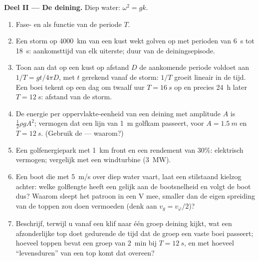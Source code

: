 \begin{problem}
\medskip
\noindent\textbf{Deel II --- De deining.}
Diep water: $\omega^2 = gk$.
\begin{enumerate}[resume]
  \item Fase- en  als functie van de periode $T$.
  \item Een storm op \qty{4000}{km} van een kust wekt golven op met perioden
        van \qty{6}{s} tot \qty{18}{s}: aankomsttijd van elk uiterste; duur
        van de deiningsepisode.
  \item Toon aan dat op een kust op afstand $D$ de aankomende periode
        voldoet aan $1/T = gt/4\pi D$, met $t$ gerekend vanaf de storm:
        $1/T$ groeit lineair in de tijd. Een boei tekent op een dag om
        twaalf uur $T = \qty{16}{s}$ op en precies \qty{24}{h} later
        $T = \qty{12}{s}$: afstand van de storm.
  \item De energie per oppervlakte-eenheid van een deining met amplitude $A$
        is $\tfrac12\rho
        gA^2$; vermogen dat een lijn van \qty{1}{m} golfkam
        passeert, voor $A =
        \qty{1.5}{m}$ en $T = \qty{12}{s}$. (Gebruik de
         --- waarom?)
  \item Een golfenergiepark met \qty{1}{km} front en een rendement van
        $30\%$: elektrisch vermogen; vergelijk met een windturbine
        (\qty{3}{MW}).
  \item Een boot die met \qty{5}{m/s} over diep water vaart, laat een
        stilstaand kielzog achter: welke golflengte heeft een 
        gelijk aan de bootsnelheid en volgt de boot dus? Waarom sleept het
        patroon in een V mee, smaller dan de eigen spreiding van de toppen
        zou doen vermoeden (denk aan $v_g = v_\varphi/2$)?
  \item Beschrijf, terwijl u vanaf een klif naar één groep deining kijkt,
        wat een afzonderlijke top doet gedurende de tijd dat de groep een
        vaste boei passeert; hoeveel toppen bevat een groep van \qty{2}{min}
        bij $T = \qty{12}{s}$, en met hoeveel ``levensduren'' van een top
        komt dat overeen?
\end{enumerate}


\end{problem}
